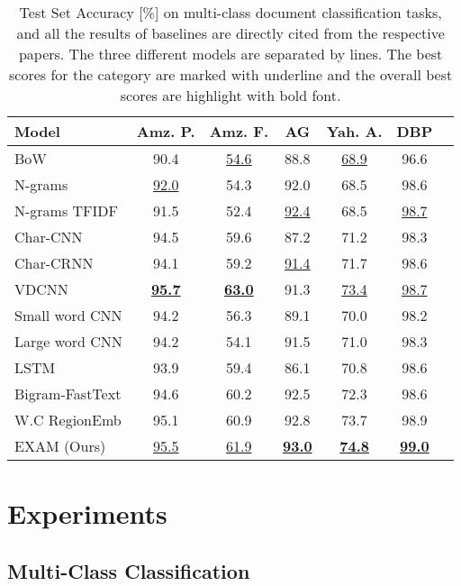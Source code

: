 \documentclass[letterpaper]{article} \usepackage{aaai19}  \usepackage{times}  \usepackage{helvet}  \usepackage{courier}  \usepackage{url}  \usepackage{graphicx}
\begin{document}
 \begin{table*}
  \caption{Test Set Accuracy [\%] on multi-class document classification tasks, and all the results of baselines are directly cited from the respective papers. The three different models are separated by lines. The best scores for the category are marked with underline and the overall best scores are highlight with bold font.}
  \label{multi-class}
  \centering
  \begin{tabular}{lcccccc}
    \toprule
    Model   &Amz. P. & Amz. F. &AG    &Yah. A. & DBP \\
    \midrule
    BoW \cite{charcnn}  & 90.4&\underline{54.6}  &88.8  &\underline{68.9} &96.6    \\
    N-grams \cite{charcnn}  &\underline{92.0} &54.3 &92.0  &68.5 &98.6    \\
    N-grams TFIDF \cite{charcnn} &91.5 & 52.4 &\underline{92.4}  &68.5 &\underline{98.7}  \\
    \midrule
    Char-CNN \cite{charcnn}  &94.5 & 59.6 &87.2  &71.2 &98.3    \\
    Char-CRNN \cite{charcnn}  &94.1 & 59.2 &\underline{91.4}  &71.7 &98.6      \\    
    VDCNN \cite{vdcnn} &\underline{\textbf{95.7}} & \underline{\textbf{63.0}} &91.3  &\underline{73.4} &\underline{98.7}    \\
    \midrule
    Small word CNN \cite{charcnn}  &94.2 & 56.3 &89.1 &70.0 &98.2      \\
    Large word CNN \cite{charcnn}  &94.2 & 54.1 &91.5  &71.0 &98.3      \\
    LSTM \cite{charcnn} &93.9 &59.4 &86.1 &70.8 &98.6\\
    Bigram-FastText \cite{fasttext} &94.6 &60.2 &92.5 &72.3 &98.6\\
    W.C RegionEmb \cite{regionemb} &95.1 &60.9 &92.8 &73.7 &98.9 \\
    EXAM (Ours)  &\underline{95.5} &\underline{61.9} & \underline{\textbf{93.0}}& \underline{\textbf{74.8}}& \underline{\textbf{99.0}}\\
    \bottomrule
  \end{tabular}
\end{table*}

\section{Experiments}
\subsection{Multi-Class Classification}
\end{document}
